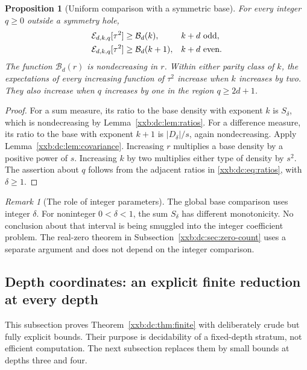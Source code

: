 \documentclass[11pt,a4paper]{article}
\numberwithin{equation}{section}
\newtheorem{proposition}[theorem]{Proposition}
\theoremstyle{definition}
\theoremstyle{remark}
\newtheorem{remark}[theorem]{Remark}
\theoremstyle{plain}
\begin{document}
\begin{proposition}[Uniform comparison with a symmetric base]\label{xxb:dc:prop:base}
For every integer $q\ge0$ outside a symmetry hole,
\begin{align}\label{xxb:dc:eq:basecmp}
 \mathcal E_{d,k,q}[\tau^2]&\ge \mathcal B_d(k),&&k+d\text{ odd},\notag\\
 \mathcal E_{d,k,q}[\tau^2]&\ge \mathcal B_d(k+1),&&k+d\text{ even}.
\end{align}
The function $\mathcal B_d(r)$ is nondecreasing in $r$.  Within either parity
class of $k$, the expectations of every increasing function of $\tau^2$
increase when $k$ increases by two.  They also increase when $q$ increases by
one in the region $q\ge2d+1$.
\end{proposition}
\begin{proof}
For a sum measure, its ratio to the base density with exponent $k$ is
$S_\delta$, which is nondecreasing by Lemma~\ref{xxb:dc:lem:ratios}.  For a
difference measure, its ratio to the base with exponent $k+1$ is
$|D_\delta|/s$, again nondecreasing.  Apply Lemma~\ref{xxb:dc:lem:covariance}.
Increasing $r$ multiplies a base density by a positive power of $s$.
Increasing $k$ by two multiplies either type of density by $s^2$.
The assertion about $q$ follows from the adjacent ratios in
\eqref{xxb:dc:eq:ratios}, with $\delta\ge1$.
\end{proof}

\begin{remark}[The role of integer parameters]\label{xxb:dc:rem:integer}
The global base comparison uses integer $\delta$.  For noninteger
$0<\delta<1$, the sum $S_\delta$ has different monotonicity.  No conclusion
about that interval is being smuggled into the integer coefficient
problem.  The real-zero theorem in Subsection~\ref{xxb:dc:sec:zero-count} uses
a separate argument and does not depend on the integer comparison.
\end{remark}

\subsection{Depth coordinates: an explicit finite reduction at every depth}\label{xxb:dc:sec:effective}

This subsection proves Theorem~\ref{xxb:dc:thm:finite} with deliberately crude
but fully explicit bounds.  Their purpose is decidability of a fixed-depth
stratum, not efficient computation.  The next subsection replaces them by
small bounds at depths three and four.
\end{document}
